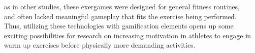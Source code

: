 as in other studies, these exergames were designed for general fitness routines, and often lacked meaningful gameplay that fits the exercise being performed.  Thus, utilizing these technologies with gamification elements opens up some exciting possibilities for research on increasing motivation in athletes to  engage in warm up exercises before physically more demanding activities. 
